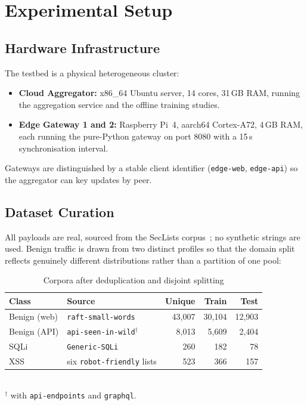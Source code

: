 \documentclass[conference]{IEEEtran}
\begin{document}
\section{Experimental Setup}
\label{sec:setup}

\subsection{Hardware Infrastructure}
The testbed is a physical heterogeneous cluster:
\begin{itemize}
    \item \textbf{Cloud Aggregator:} x86\_64 Ubuntu server, 14 cores, 31\,GB RAM, running the aggregation service and the offline training studies.
    \item \textbf{Edge Gateway 1 and 2:} Raspberry Pi~4, aarch64 Cortex-A72, 4\,GB RAM, each running the pure-Python gateway on port 8080 with a 15\,s synchronisation interval.
\end{itemize}
Gateways are distinguished by a stable client identifier (\texttt{edge-web}, \texttt{edge-api}) so the aggregator can key updates by peer.

\subsection{Dataset Curation}
All payloads are real, sourced from the SecLists corpus~\cite{seclists}; no synthetic strings are used. Benign traffic is drawn from two distinct profiles so that the domain split reflects genuinely different distributions rather than a partition of one pool:

\begin{table}[htbp]
\centering
\caption{Corpora after deduplication and disjoint splitting}
\label{tab:corpora}
\setlength{\tabcolsep}{3.5pt}
\begin{tabular}{@{}llrrr@{}}
\toprule
\textbf{Class} & \textbf{Source} & \textbf{Unique} & \textbf{Train} & \textbf{Test} \\ \midrule
Benign (web) & \texttt{raft-small-words} & 43{,}007 & 30{,}104 & 12{,}903 \\
Benign (API) & \texttt{api-seen-in-wild}$^{\dagger}$ & 8{,}013 & 5{,}609 & 2{,}404 \\
SQLi & \texttt{Generic-SQLi} & 260 & 182 & 78 \\
XSS & six \texttt{robot-friendly} lists & 523 & 366 & 157 \\ \bottomrule
\end{tabular}
\\[2pt]
{\footnotesize $^{\dagger}$ with \texttt{api-endpoints} and \texttt{graphql}.}
\end{table}
\end{document}
